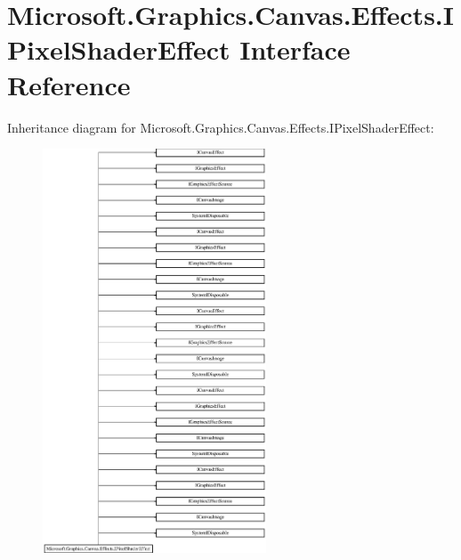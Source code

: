 \hypertarget{interface_microsoft_1_1_graphics_1_1_canvas_1_1_effects_1_1_i_pixel_shader_effect}{}\section{Microsoft.\+Graphics.\+Canvas.\+Effects.\+I\+Pixel\+Shader\+Effect Interface Reference}
\label{interface_microsoft_1_1_graphics_1_1_canvas_1_1_effects_1_1_i_pixel_shader_effect}
Inheritance diagram for Microsoft.\+Graphics.\+Canvas.\+Effects.\+I\+Pixel\+Shader\+Effect\+:\begin{figure}[H]
\begin{center}
\leavevmode
\includegraphics[height=12.000000cm]{interface_microsoft_1_1_graphics_1_1_canvas_1_1_effects_1_1_i_pixel_shader_effect}
\end{center}
\end{figure}
